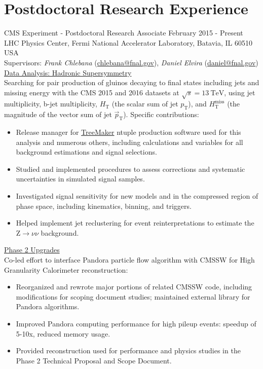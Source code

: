 \setlength{\parskip}{0pt}
\def\hslash{{\hbox{$H$\kern-0.8em\lower-.05ex\hbox{/}\kern0.10em}}}
\section{Postdoctoral Research Experience}
CMS Experiment - Postdoctoral Research Associate \hfill February 2015 - Present\\
LHC Physics Center, Fermi National Accelerator Laboratory, Batavia, IL 60510 USA\\
Supervisors: {\sl Frank Chlebana} (\href{mailto:chlebana@fnal.gov}{chlebana@fnal.gov}), {\sl Daniel Elvira} (\href{mailto:daniel@fnal.gov}{daniel@fnal.gov})\\
\underline{Data Analysis: Hadronic Supersymmetry}\\
Searching for pair production of gluinos decaying to final states including jets and missing energy with the CMS 2015 and 2016 datasets at $\sqrt{s}=13~\text{TeV}$, using jet multiplicity, b-jet multiplicity, $H_{\text{T}}$ (the scalar sum of jet $p_{\text{T}}$), and $H_{\text{T}}^{\text{miss}}$ (the magnitude of the vector sum of jet $\vec{p}_{\text{T}}$). Specific contributions:
\begin{itemize}[leftmargin=12pt]
\item Release manager for \href{https://github.com/TreeMaker/TreeMaker}{TreeMaker} ntuple production software used for this analysis and numerous others, including calculations and variables for all background estimations and signal selections.
\item Studied and implemented procedures to assess corrections and systematic uncertainties in simulated signal samples.
\item Investigated signal sensitivity for new models and in the compressed region of phase space, including kinematics, binning, and triggers.
\item Helped implement jet reclustering for event reinterpretations to estimate the $\text{Z}\to\nu\nu$ background.
\end{itemize}
\underline{Phase 2 Upgrades}\\
Co-led effort to interface Pandora particle flow algorithm with CMSSW for High Granularity Calorimeter reconstruction:
\begin{itemize}[leftmargin=12pt]
\item Reorganized and rewrote major portions of related CMSSW code, including modifications for scoping document studies; maintained external library for Pandora algorithms.
\item Improved Pandora computing performance for high pileup events: speedup of 5-10x, reduced memory usage.
\item Provided reconstruction used for performance and physics studies in the Phase 2 Technical Proposal and Scope Document.
\end{itemize}
